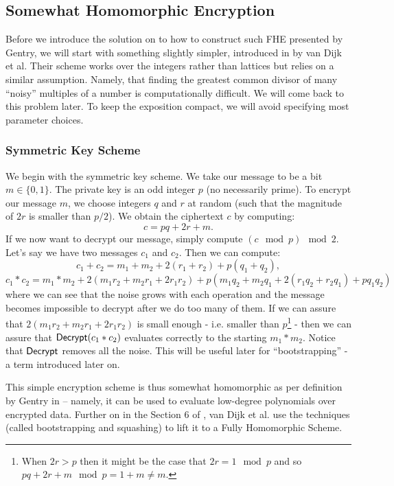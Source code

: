 \subsection{Somewhat Homomorphic Encryption}\label{int_she}
Before we introduce the solution on to how to construct such FHE presented by Gentry, we will start with something slightly simpler, introduced in \cite{int_scheme} by van Dijk et al. Their scheme works over the integers rather than lattices but relies on a similar assumption. Namely, that finding the greatest common divisor of many ``noisy'' multiples of a number is computationally difficult. We will come back to this problem later. To keep the exposition compact, we will avoid specifying most parameter choices.

\subsubsection*{Symmetric Key Scheme}
We begin with the symmetric key scheme. We take our message to be a bit $m \in \{0,1\}$. The private key is an odd integer $p$ (no necessarily prime). To encrypt our message $m$, we choose integers $q$ and $r$ at random (such that the magnitude of $2r$ is smaller than $p/2$). We obtain the ciphertext $c$ by computing: 
\begin{equation}c = pq + 2r + m.\end{equation}
If we now want to decrypt our message, simply compute $(c \mod p) \mod 2$. \\
Let's say we have two messages $c_1$ and $c_2$. Then we can compute:
$$ c_1 + c_2 = m_1 + m_2 + 2(r_1 + r_2) + p(q_1 + q_2),$$
$$ c_1 * c_2 = m_1 * m_2 + 2(m_1r_2 + m_2r_1 + 2r_1r_2) + p(m_1q_2 + m_2q_1 + 2(r_1q_2 + r_2q_1) + pq_1q_2)$$
where we can see that the noise grows with each operation and the message becomes impossible to decrypt after we do too many of them. If we can assure that $2(m_1r_2 + m_2r_1 + 2r_1r_2)$ is small enough - i.e. smaller than $p$\footnote{When $2r > p$ then it might be the case that $2r = 1 \mod p$ and so $pq + 2r + m \mod p = 1 + m \neq m$.} - then we can assure that $\alg{Decrypt}(c_1 * c_2)$ evaluates correctly to the starting $m_1 * m_2$. Notice that $\alg{Decrypt}$ removes all the noise. This will be useful later for ``bootstrapping'' - a term introduced later on.

This simple encryption scheme is thus somewhat homomorphic as per definition by Gentry in \cite{gentry_phd} – namely, it can be used to evaluate low-degree polynomials over encrypted data. Further on in the Section 6 of \cite{int_scheme}, van Dijk et al. use the techniques (called bootstrapping and squashing) to lift it to a Fully Homomorphic Scheme.
